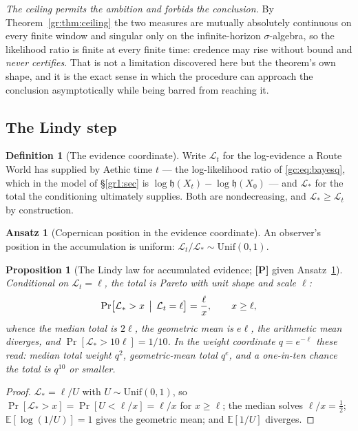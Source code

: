 \documentclass[11pt]{article}
\numberwithin{equation}{section}
\theoremstyle{plain}
\newtheorem{proposition}[theorem]{Proposition}
\theoremstyle{definition}
\newtheorem{definition}[theorem]{Definition}
\newtheorem{ansatz}[theorem]{Ansatz}
\theoremstyle{remark}
\newcommand{\E}{\mathbb{E}}
\newcommand{\Lc}{\mathcal{L}}
\newcommand{\hm}{\mathfrak{h}}
\begin{document}
\emph{The ceiling permits the ambition and forbids the conclusion.} By
Theorem~\ref{gr:thm:ceiling} the two measures are mutually absolutely
continuous on every finite window and singular only on the
infinite-horizon $\sigma$-algebra, so the likelihood ratio is finite at
every finite time: credence may rise without bound and \emph{never
certifies}. That is not a limitation discovered here but the theorem's
own shape, and it is the exact sense in which the procedure can approach
the conclusion asymptotically while being barred from reaching it.


\subsection{The Lindy step}\label{gc:sub:lindy}

\begin{definition}[The evidence coordinate]\label{gc:def:evidence}
Write $\Lc_t$ for the log-evidence a Route World has supplied by Aethic
time $t$ --- the log-likelihood ratio of \eqref{gc:eq:bayesq}, which in
the model of \S\ref{gr1:sec} is $\log\hm(X_t)-\log\hm(X_0)$ --- and
$\Lc_\ast$ for the total the conditioning ultimately supplies. Both are
nondecreasing, and $\Lc_\ast\ge\Lc_t$ by construction.
\end{definition}

\begin{ansatz}[Copernican position in the evidence coordinate]
\label{gc:ans:copernican}
An observer's position in the accumulation is uniform:
$\Lc_t/\Lc_\ast\sim\mathrm{Unif}(0,1)$.
\end{ansatz}

\begin{proposition}[The Lindy law for accumulated evidence;
\textbf{[P]} given Ansatz~\ref{gc:ans:copernican}]\label{gc:prop:lindy}
Conditional on $\Lc_t=\ell$, the total is Pareto with unit shape and
scale $\ell$:
\begin{equation}\label{gc:eq:lindylaw}
\Pr\bigl[\Lc_\ast>x\,\bigm|\,\Lc_t=\ell\bigr]=\frac{\ell}{x},
\qquad x\ge\ell,
\end{equation}
whence the median total is $2\ell$, the geometric mean is $e\ell$, the
arithmetic mean diverges, and $\Pr[\Lc_\ast>10\ell]=1/10$. In the
weight coordinate $q=e^{-\ell}$ these read: median total weight $q^{2}$,
geometric-mean total $q^{e}$, and a one-in-ten chance the total is
$q^{10}$ or smaller.
\end{proposition}

\begin{proof}
$\Lc_\ast=\ell/U$ with $U\sim\mathrm{Unif}(0,1)$, so
$\Pr[\Lc_\ast>x]=\Pr[U<\ell/x]=\ell/x$ for $x\ge\ell$; the median solves
$\ell/x=\tfrac12$; $\E[\log(1/U)]=1$ gives the geometric mean; and
$\E[1/U]$ diverges.
\end{proof}
\end{document}
